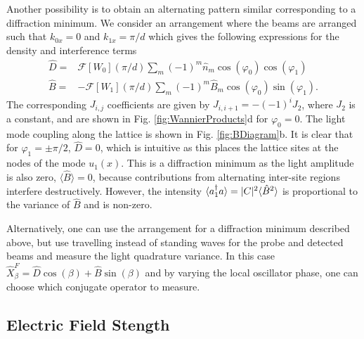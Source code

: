 Another possibility is to obtain an alternating pattern similar
corresponding to a diffraction minimum. We consider an arrangement
where the beams are arranged such that $k_{0x} = 0$ and
$k_{1x} = \pi/d$ which gives the following expressions for the density
and interference terms
\begin{align}
  \label{eq:DMin}
  \hat{D} = & \mathcal{F}[W_0](\pi/d) \sum_m (-1)^m \hat{n}_m
              \cos(\varphi_0) \cos(\varphi_1) \nonumber \\ 
  \hat{B} = & -\mathcal{F}[W_1](\pi/d) \sum_m (-1)^m \hat{B}_m
              \cos(\varphi_0) \sin(\varphi_1).
\end{align}
The corresponding $J_{i,j}$ coefficients are given by
$J_{i,i+1} = -(-1)^i J_2$, where $J_2$ is a constant, and are shown in
Fig. \ref{fig:WannierProducts}d for $\varphi_0=0$. The light mode
coupling along the lattice is shown in Fig. \ref{fig:BDiagram}b. It is
clear that for $\varphi_1 = \pm \pi/2$, $\hat{D} = 0$, which is
intuitive as this places the lattice sites at the nodes of the mode
$u_1(x)$. This is a diffraction minimum as the light amplitude is also
zero, $\langle \hat{B} \rangle = 0$, because contributions from
alternating inter-site regions interfere destructively. However, the
intensity $\langle a^\dagger_1 a \rangle = |C|^2 \langle \hat{B}^2 \rangle$
is proportional to the variance of $\hat{B}$ and is non-zero.

Alternatively, one can use the arrangement for a diffraction minimum
described above, but use travelling instead of standing waves for the
probe and detected beams and measure the light quadrature variance.
In this case
$\hat{X}^F_\beta = \hat{D} \cos(\beta) + \hat{B} \sin(\beta)$ and by
varying the local oscillator phase, one can choose which conjugate
operator to measure.

\subsection{Electric Field Stength}
\label{sec:Efield}

